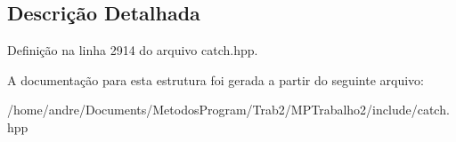 \subsection{Descrição Detalhada}


Definição na linha 2914 do arquivo catch.\+hpp.



A documentação para esta estrutura foi gerada a partir do seguinte arquivo\+:\begin{DoxyCompactItemize}
\item 
/home/andre/\+Documents/\+Metodos\+Program/\+Trab2/\+M\+P\+Trabalho2/include/catch.\+hpp\end{DoxyCompactItemize}
